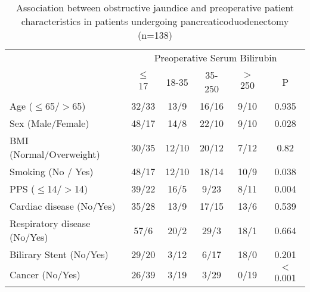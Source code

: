\begin{table}[htbp]

\caption{Association between obstructive jaundice and preoperative patient characteristics in patients undergoing pancreaticoduodenectomy  (n=138)}
\label{table:cpet_oj_table1}

\centering\renewcommand{\arraystretch}{1.4} %


	\begin{tabular}{l c c c c c}
		\hline
		                             & \multicolumn{5}{c}{Preoperative Serum Bilirubin} \\
		                             & $\leq$ 17 & 18-35 & 35-250 & $>$ 250 & P         \\ \hline
		Age ($\leq$65/$>$65)         & 32/33     & 13/9  & 16/16  & 9/10    & 0.935     \\
		Sex (Male/Female)            & 48/17     & 14/8  & 22/10  & 9/10    & 0.028     \\
		BMI (Normal/Overweight)      & 30/35     & 12/10 & 20/12  & 7/12    & 0.82      \\
		Smoking (No / Yes)           & 48/17     & 12/10 & 18/14  & 10/9    & 0.038     \\
		PPS ($\leq$14/$>$14)         & 39/22     & 16/5  & 9/23   & 8/11    & 0.004     \\
		Cardiac disease (No/Yes)     & 35/28     & 13/9  & 17/15  & 13/6    & 0.539     \\
		Respiratory disease (No/Yes) & 57/6      & 20/2  & 29/3   & 18/1    & 0.664     \\
		Bilirary Stent (No/Yes)      & 29/20     & 3/12  & 6/17   & 18/0    & 0.201     \\
		Cancer (No/Yes)              & 26/39     & 3/19  & 3/29   & 0/19    & $<$0.001  \\ \hline
	\end{tabular}

\end{table}